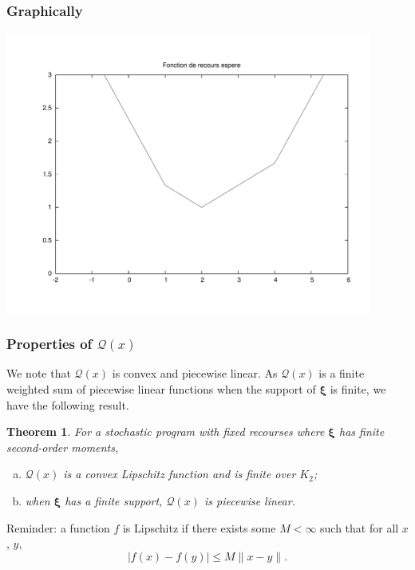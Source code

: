 \documentclass{beamer}
\newtheorem{theo}{Theorem}
\def\bxi{\boldsymbol\xi}
\def\bxi{\boldsymbol\xi}
\begin{document}
\begin{frame}
\frametitle{Graphically}

\includegraphics[width=0.9\textwidth]{recourse_all.pdf}

\end{frame}

\begin{frame}
\frametitle{Properties of $\mathcal{Q}(x)$}

We note that $\mathcal{Q}(x)$ is convex and piecewise linear.
As $\mathcal{Q}(x)$ is a finite weighted sum of piecewise linear functions when the support of $\bxi$ is finite, we have the following result.

\begin{theo}
For a stochastic program with fixed recourses where $\bxi$ has finite second-order moments,
\begin{enumerate}[(a)]
\item
$\mathcal{Q}(x)$ is a convex Lipschitz function and is finite over $K_2$;
\item
when $\bxi$ has a finite support, $\mathcal{Q}(x)$ is piecewise linear.
\end{enumerate}
\end{theo}

Reminder: a function $f$ is Lipschitz if there exists some $M < \infty$ such that for all $x$, $y$,
\[
|f(x)-f(y)| \leq M \| x-y \|.
\]

\end{frame}
\end{document}
